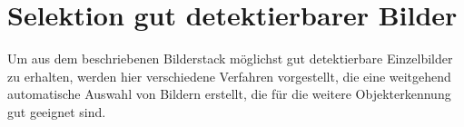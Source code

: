 
\chapter{Selektion gut detektierbarer Bilder}
\label{chap:slk}
	Um aus dem beschriebenen Bilderstack möglichst gut detektierbare Einzelbilder zu erhalten, werden hier verschiedene Verfahren vorgestellt, die eine weitgehend automatische Auswahl von Bildern erstellt, die für die weitere Objekterkennung gut geeignet sind.
	


